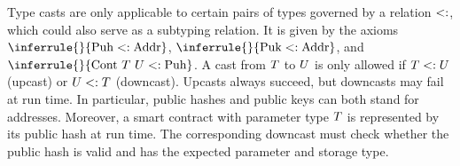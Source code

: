 \documentclass[runningheads]{llncs}
\begin{document}


Type casts are only applicable to certain pairs of
types governed by a relation $<:$, which could also serve as a
subtyping relation. It is given by the axioms
$\inferrule{}{\TPUH \SubType \TADDR}$, $\inferrule{}{\TPUK \SubType
  \TADDR}$, and $\inferrule{}{\TCONTRACT\ \TYPE\ \TYPEU \SubType \TPUH}$.
A cast from $T$ to $U$ is only allowed
if $T <: U$ (upcast) or $U <: T$
(downcast). Upcasts always succeed, but downcasts may fail at run time.
In particular,  public hashes and public keys can both stand for addresses. Moreover, a smart
contract with parameter type $T$ is represented by its public hash
at run time. The corresponding downcast must check whether the public
hash is valid and has the expected parameter and storage type.
\end{document}
